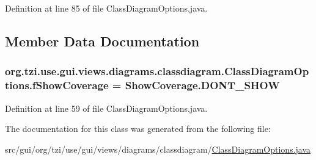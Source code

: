 Definition at line 85 of file Class\-Diagram\-Options.\-java.



\subsection{Member Data Documentation}
\hypertarget{classorg_1_1tzi_1_1use_1_1gui_1_1views_1_1diagrams_1_1classdiagram_1_1_class_diagram_options_a4a728d0cdf8f4575edbf711dd9028fb3}{
\subsubsection[{f\-Show\-Coverage}]{ org.\-tzi.\-use.\-gui.\-views.\-diagrams.\-classdiagram.\-Class\-Diagram\-Options.\-f\-Show\-Coverage = {\bf Show\-Coverage.\-D\-O\-N\-T\-\_\-\-S\-H\-O\-W}\hspace{0.3cm}{\ttfamily [protected]}}}\label{classorg_1_1tzi_1_1use_1_1gui_1_1views_1_1diagrams_1_1classdiagram_1_1_class_diagram_options_a4a728d0cdf8f4575edbf711dd9028fb3}


Definition at line 59 of file Class\-Diagram\-Options.\-java.



The documentation for this class was generated from the following file\-:\begin{DoxyCompactItemize}
\item 
src/gui/org/tzi/use/gui/views/diagrams/classdiagram/\hyperlink{_class_diagram_options_8java}{Class\-Diagram\-Options.\-java}\end{DoxyCompactItemize}
